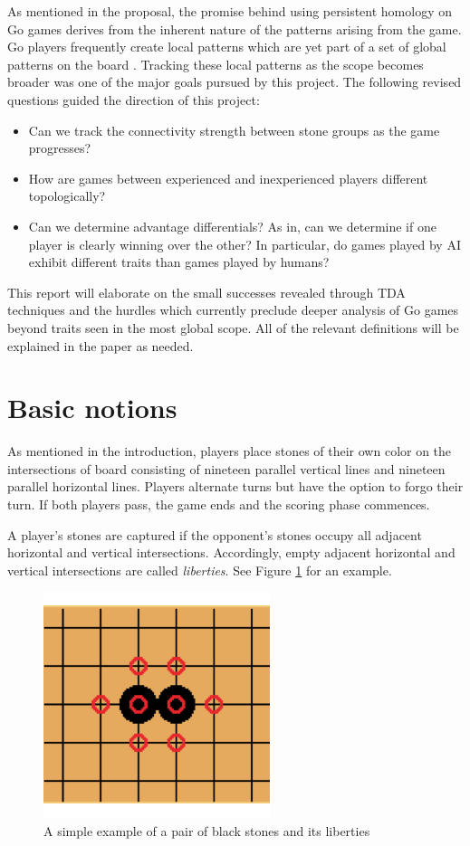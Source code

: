 \documentclass[11pt]{article}
\begin{document}
As mentioned in the proposal, the promise behind using persistent homology on Go games derives from the inherent nature of the patterns arising from the game. Go players frequently create local patterns which are yet part of a set of global patterns on the board \cite{bays}. Tracking these local patterns as the scope becomes broader was one of the major goals pursued by this project. The following revised questions guided the direction of this project:
\begin{itemize}
  \item Can we track the connectivity strength between stone groups as the game progresses?
  \item How are games between experienced and inexperienced players different topologically?
  \item Can we determine advantage differentials? As in, can we determine if one player is clearly winning over the other? In particular, do games played by AI exhibit different traits than games played by humans?
\end{itemize}

This report will elaborate on the small successes revealed through TDA techniques and the hurdles which currently preclude deeper analysis of Go games beyond traits seen in the most global scope. All of the relevant definitions will be explained in the paper as needed.

\section{Basic notions} \label{notions}
As mentioned in the introduction, players place stones of their own color on the intersections of board consisting of nineteen parallel vertical lines and nineteen parallel horizontal lines. Players alternate turns but have the option to forgo their turn. If both players pass, the game ends and the scoring phase commences.

A player's stones are captured if the opponent's stones occupy all adjacent horizontal and vertical intersections. Accordingly, empty adjacent horizontal and vertical intersections are called \textit{liberties}. See Figure \ref{fig:lib1} for an example.

\begin{figure}[ht]
  \centering
  \includegraphics{lib1.png}
  \caption{A simple example of a pair of black stones and its liberties}
  \label{fig:lib1}
\end{figure}
\end{document}
